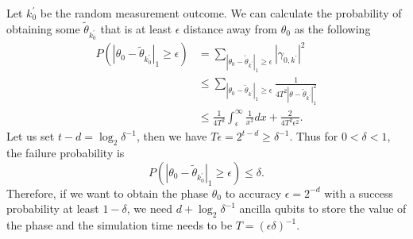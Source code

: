 \documentclass[11pt]{article}
\begin{document}
Let $k_0^{'}$ be the random measurement outcome. We can calculate the probability of obtaining some $\tilde{\theta}_{k_0^{'}}$ that is at least $\epsilon$ distance away from $\theta_0$ as the following 
\begin{align}
    P(|\theta_0 - \tilde{\theta}_{k_0^{'}}|_1 \geq \epsilon) &= \sum_{|\theta_0 - \tilde{\theta}_{k^{'}}|_1 \geq \epsilon} |\gamma_{0,k^{'}}|^2 \nonumber \\
    &\leq \sum_{|\theta_0 - \tilde{\theta}_{k^{'}}|_1 \geq \epsilon} \frac{1}{4T^2|\theta-\tilde{\theta}_{k^{'}}|_1^2} \nonumber \\
    &\leq \frac{1}{4T^2}\int_{\epsilon}^{\infty}\frac{1}{x^2}dx + \frac{2}{4T^2\epsilon^2}.
\end{align}
Let us set $t - d = \log_2\delta^{-1}$, then we have $T\epsilon = 2^{t-d}\geq \delta^{-1}$. Thus for $0<\delta<1$, the failure probability is 
\begin{equation}
    P(|\theta_0 - \tilde{\theta}_{k_0^{'}}|_1 \geq \epsilon) \leq \delta.
\end{equation} 
Therefore, if we want to obtain the phase $\theta_0$ to accuracy $\epsilon = 2^{-d}$ with a success probability at least $1-\delta$, we need $d + \log_2\delta^{-1}$ ancilla qubits to store the value of the phase and the simulation time needs to be $T = (\epsilon\delta)^{-1}$.



\end{document}

